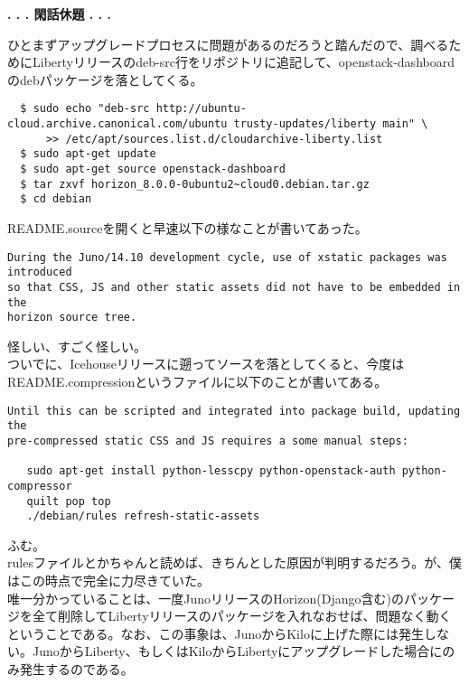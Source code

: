 \documentclass[9pt,b5paper,tombo,openany]{jsbook}
\begin{document}
\noindent
\textbf{. . . 閑話休題 . . .}

ひとまずアップグレードプロセスに問題があるのだろうと踏んだので、調べるためにLibertyリリースのdeb-src行をリポジトリに追記して、openstack-dashboardのdebパッケージを落としてくる。

\begin{lstlisting}
  $ sudo echo "deb-src http://ubuntu-cloud.archive.canonical.com/ubuntu trusty-updates/liberty main" \
      >> /etc/apt/sources.list.d/cloudarchive-liberty.list
  $ sudo apt-get update
  $ sudo apt-get source openstack-dashboard
  $ tar zxvf horizon_8.0.0-0ubuntu2~cloud0.debian.tar.gz
  $ cd debian
\end{lstlisting}

\noindent
README.sourceを開くと早速以下の様なことが書いてあった。

\begin{lstlisting}
During the Juno/14.10 development cycle, use of xstatic packages was introduced
so that CSS, JS and other static assets did not have to be embedded in the
horizon source tree.
\end{lstlisting}

\noindent
怪しい、すごく怪しい。\\[1ex]

ついでに、Icehouseリリースに遡ってソースを落としてくると、今度はREADME.compressionというファイルに以下のことが書いてある。

\begin{lstlisting}
Until this can be scripted and integrated into package build, updating the
pre-compressed static CSS and JS requires a some manual steps:

   sudo apt-get install python-lesscpy python-openstack-auth python-compressor
   quilt pop top
   ./debian/rules refresh-static-assets
\end{lstlisting}

\noindent
ふむ。\\[1ex]

rulesファイルとかちゃんと読めば、きちんとした原因が判明するだろう。が、僕はこの時点で完全に力尽きていた。\\[1ex]

唯一分かっていることは、一度JunoリリースのHorizon(Django含む)のパッケージを全て削除してLibertyリリースのパッケージを入れなおせば、問題なく動くということである。なお、この事象は、JunoからKiloに上げた際には発生しない。JunoからLiberty、もしくはKiloからLibertyにアップグレードした場合にのみ発生するのである。\\[1ex]
\end{document}
